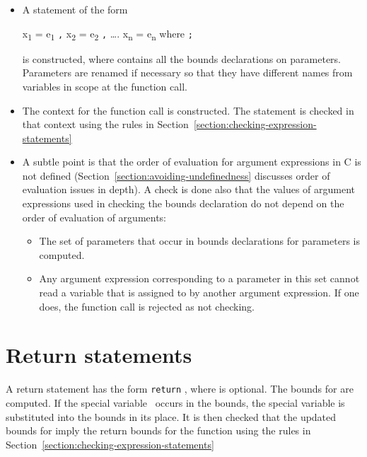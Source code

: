 \begin{itemize}
\item
  A statement of the form

  x\textsubscript{1} = e\textsubscript{1} \texttt{,} x\textsubscript{2} = 
  e\textsubscript{2} \texttt{,} \ldots{}. x\textsubscript{n} =
  e\textsubscript{n} where  \texttt{;}

  is constructed, where  contains all the bounds
  declarations on parameters. Parameters are renamed if necessary so
  that they have different names from variables in scope at the function
  call.
\item
  The context for the function call is constructed. The statement is
  checked in that context using the rules in 
  Section~\ref{section:checking-expression-statements}
\item
  A subtle point is that the order of evaluation for argument
  expressions in C is not defined (Section~\ref{section:avoiding-undefinedness}
  discusses order of
  evaluation issues in depth). A check is done also that the values of
  argument expressions used in checking the bounds declaration do not
  depend on the order of evaluation of arguments:

  \begin{itemize}
  \item
    The set of parameters that occur in bounds declarations for
    parameters is computed.
  \item
    Any argument expression corresponding to a parameter in this set
    cannot read a variable that is assigned to by another argument
    expression. If one does, the function call is rejected as not
    checking.
  \end{itemize}
\end{itemize}

 \section{Return statements}

A return statement has the form \texttt{return} , where 
is optional. The bounds for  are computed. If the special
variable \exprcurrentvalue\ occurs in the bounds, the special
variable  is substituted into the bounds in its
place. It is then checked that the updated bounds for  imply the
return bounds for the function using the rules in 
Section~\ref{section:checking-expression-statements}

